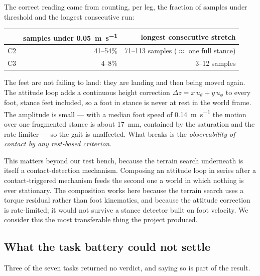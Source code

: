 \documentclass[11pt,a4paper]{article}
\newcommand{\Ct}{\textsf{C2}}
\newcommand{\Cth}{\textsf{C3}}
\begin{document}
The correct reading came from counting, per leg, the fraction of samples under
threshold and the longest consecutive run:

\begin{center}
\small
\begin{tabular}{@{}lrr@{}}
\toprule
 & samples under \SI{0.05}{\meter\per\second} & longest consecutive stretch \\
\midrule
\Ct  & 41--54\% & 71--113 samples ($\approx$ one full stance) \\
\Cth & 4--8\%   & 3--12 samples \\
\bottomrule
\end{tabular}
\end{center}

The feet are not failing to land: they are landing and then being moved again.
The attitude loop adds a continuous height correction
$\Delta z = x\,u_\theta + y\,u_\phi$ to every foot, stance feet included, so a
foot in stance is never at rest in the world frame. The amplitude is small ---
with a median foot speed of \SI{0.14}{\meter\per\second} the motion over one
fragmented stance is about \SI{17}{\milli\meter}, contained by the saturation
and the rate limiter --- so the gait is unaffected. What breaks is the
\emph{observability of contact by any rest-based criterion}.

This matters beyond our test bench, because the terrain search underneath is
itself a contact-detection mechanism. Composing an attitude loop in series
after a contact-triggered mechanism feeds the second one a world in which
nothing is ever stationary. The composition works here because the terrain
search uses a torque residual rather than foot kinematics, and because the
attitude correction is rate-limited; it would not survive a stance detector
built on foot velocity. We consider this the most transferable thing the
project produced.

\subsection{What the task battery could not settle}

Three of the seven tasks returned no verdict, and saying so is part of the
result.
\end{document}
